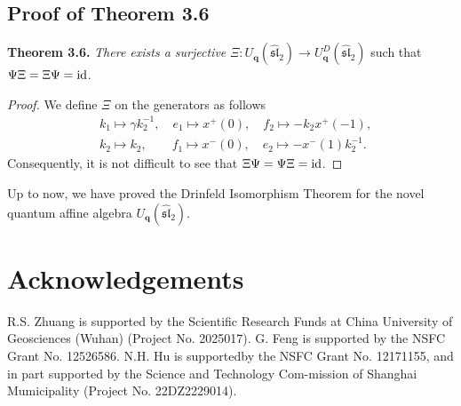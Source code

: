 \documentclass[12pt]{amsart}
\numberwithin{equation}{section}
\numberwithin{equation}{section}
\begin{document}
\subsection{Proof of Theorem 3.6}

\textbf{Theorem 3.6.}
\textit{There exists a surjective} \(\Xi: U_{\textbf{q}}(\widehat{\mathfrak{sl}}_{2}) \to U_{\textbf{q}}^{D}(\widehat{\mathfrak{sl}}_{2})\) such that \(\Psi\Xi=\Xi\Psi=\text{\rm id}\).
\begin{proof}
We define \(\Xi\) on the generators as follows
\begin{align*}
&k_{1} \longmapsto \gamma k^{-1}_2, \quad e_{1} \longmapsto x^{+}(0), \quad f_{2} \longmapsto -k_2x^{+}(-1), \\
&k_{2} \longmapsto k_2, \qquad f_{1} \longmapsto x^{-}(0), \quad e_{2} \longmapsto -x^{-}(1)k^{-1}_2.
\end{align*}
Consequently, it is not difficult to see that \(\Xi \Psi = \Psi\Xi=\text{\rm id}\).  
\end{proof}
Up to now, we have proved the Drinfeld Isomorphism Theorem for the novel quantum affine algebra \(U_{\textbf{q}}(\widehat{\mathfrak{sl}}_2)\).

\section*{Acknowledgements}
R.S. Zhuang is supported by the Scientific Research Funds at China University of
Geosciences (Wuhan) (Project No. 2025017). G. Feng is supported by the NSFC Grant No. 12526586. N.H. Hu is supportedby the NSFC Grant No. 12171155, and in part supported by the Science and Technology Com-mission of Shanghai Mumicipality (Project No. 22DZ2229014).
\end{document}
